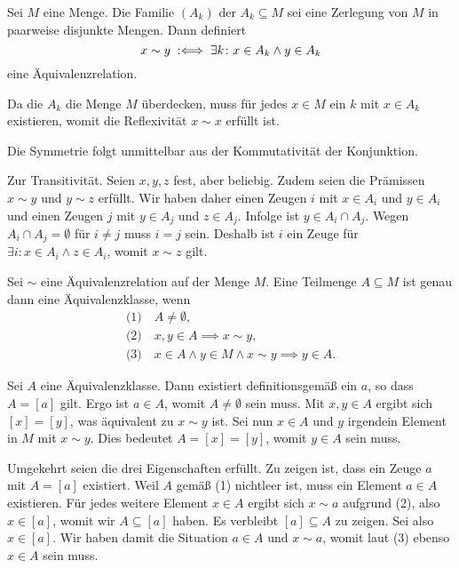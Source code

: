 \begin{Satz}\newlinefirst
Sei $M$ eine Menge. Die Familie $(A_k)$ der $A_k\subseteq M$ sei
eine Zerlegung von $M$ in paarweise disjunkte Mengen. Dann definiert
\[x\sim y\;:\Longleftrightarrow\; \exists k\colon x\in A_k\land y\in A_k\]
eine Äquivalenzrelation.
\end{Satz}
\begin{Beweis}
Da die $A_k$ die Menge $M$ überdecken, muss für jedes $x\in M$
ein $k$ mit $x\in A_k$ existieren, womit die Reflexivität
$x\sim x$ erfüllt ist.

Die Symmetrie folgt unmittelbar aus der Kommutativität der Konjunktion.

Zur Transitivität. Seien $x,y,z$ fest, aber beliebig. Zudem seien die
Prämissen $x\sim y$ und $y\sim z$ erfüllt. Wir haben daher einen Zeugen
$i$ mit $x\in A_i$ und $y\in A_i$ und einen Zeugen $j$ mit $y\in A_j$
und $z\in A_j$. Infolge ist $y\in A_i\cap A_j$. Wegen
$A_i\cap A_j=\emptyset$ für $i\ne j$ muss $i=j$ sein. Deshalb ist
$i$ ein Zeuge für $\exists i\colon x\in A_i\land z\in A_i$, womit
$x\sim z$ gilt.\,\qedsymbol
\end{Beweis}

\begin{Satz}\newlinefirst
Sei $\sim$ eine Äquivalenzrelation auf der Menge $M$. Eine
Teilmenge $A\subseteq M$ ist genau dann eine Äquivalenzklasse, wenn%
\begin{gather*}
\text{(1)}\quad A\ne\emptyset,\\
\text{(2)}\quad x,y\in A\implies x\sim y,\\
\text{(3)}\quad x\in A\land y\in M\land x\sim y\implies y\in A.
\end{gather*}
\end{Satz}
\begin{Beweis}
Sei $A$ eine Äquivalenzklasse. Dann existiert definitionsgemäß
ein $a$, so dass $A=[a]$ gilt. Ergo ist $a\in A$, womit
$A\ne\emptyset$ sein muss. Mit $x,y\in A$ ergibt sich $[x]=[y]$,
was äquivalent zu $x\sim y$ ist. Sei nun $x\in A$ und $y$ irgendein
Element in $M$ mit $x\sim y$. Dies bedeutet $A=[x]=[y]$, womit
$y\in A$ sein muss.

Umgekehrt seien die drei Eigenschaften erfüllt. Zu zeigen ist,
dass ein Zeuge $a$ mit $A=[a]$ existiert. Weil $A$ gemäß (1)
nichtleer ist, muss ein Element $a\in A$ existieren. Für jedes
weitere Element $x\in A$ ergibt sich $x\sim a$ aufgrund (2),
also $x\in [a]$, womit wir $A\subseteq [a]$ haben.
Es verbleibt $[a]\subseteq A$ zu zeigen. Sei also $x\in [a]$.
Wir haben damit die Situation $a\in A$ und $x\sim a$, womit
laut (3) ebenso $x\in A$ sein muss.\,\qedsymbol
\end{Beweis}

